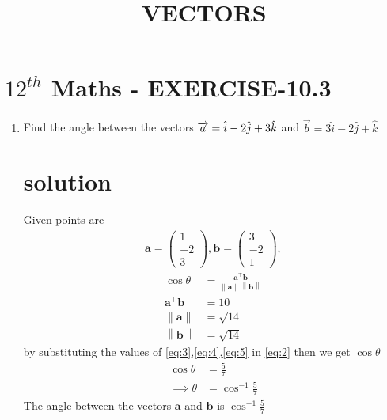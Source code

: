 \documentclass[journal,12pt]{article}
\newcommand{\myvec}[1]{\ensuremath{\begin{pmatrix}#1\end{pmatrix}}}
\providecommand{\norm}[1]{\left\lVert#1\right\rVert}
\let\vec\mathbf
\begin{document}
\begin{center}
\title{\textbf{VECTORS}}
\date{\vspace{-5ex}} %
\maketitle
\end{center}

\section*{$12^{th}$ Maths - EXERCISE-10.3}

\begin{enumerate}
\item Find the angle between the vectors $\\ \overrightarrow{a}=\hat{i}-2\hat{j}+3\hat{k}$ and $\overrightarrow{b}=3\hat{i}-2\hat{j}+\hat{k}$  
\section*{solution}
Given points are
\begin{align}
\vec{a} = \myvec{1\\-2\\3} , \vec{b} = \myvec{3\\ -2 \\ 1},
\end{align}
\begin{align}
\cos\theta&=\frac{\vec{a}^{\top}\vec{b}}{\norm{\vec{a}}\norm{\vec{b}}}\label{eq:2}\\
\vec{a}^{\top}\vec{b}&=10 \label{eq:3} \\
\norm{\vec{a}}&=\sqrt{14} \label{eq:4}\\
\norm{\vec{b}}&=\sqrt{14}
\label{eq:5}
\end{align}
		by substituting the values of \eqref{eq:3},\eqref{eq:4},\eqref{eq:5} in \eqref{eq:2} then  we get $\cos\theta$
\begin{align}
	\cos\theta &= \frac{5}{7}\\
	\implies \theta&= \cos^{-1}\frac{5}{7}
\end{align}
 The angle between the vectors $\vec{a}$ and $\vec{b}$ is $\cos^{-1}\frac{5}{7}$
\end{enumerate}
\end{document}
